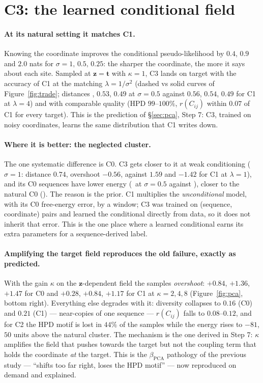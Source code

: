 \section{C3: the learned conditional field}\label{sec:c3}
\paragraph{At its natural setting it matches C1.} Knowing the coordinate improves the conditional
pseudo-likelihood by $0.4$, $0.9$ and $2.0$ nats for $\sigma=1,\,0.5,\,0.25$: the sharper the
coordinate, the more it says about each site. Sampled at $\bm z=\bm t$ with $\kappa=1$, C3 lands on
target with the accuracy of C1 at the matching $\lambda=1/\sigma^2$ (dashed vs solid curves of
Figure~\ref{fig:trade}; distances \CthreeAsHKonedist, $0.53$, $0.49$ at $\sigma=0.5$ against $0.56$,
$0.54$, $0.49$ for C1 at $\lambda=4$) and with comparable quality (HPD $99$--$100\%$,
$r(C_{ij})$ within $0.07$ of C1 for every target). This is the prediction of \S\ref{sec:pca}, Step 7: C3,
trained on noisy coordinates, learns the same distribution that C1 writes down.

\paragraph{Where it is better: the neglected cluster.} The one systematic difference is C0. C3 gets
closer to it at weak conditioning ($\sigma=1$: distance $0.74$, overshoot $-0.56$, against $1.59$
and $-1.42$ for C1 at $\lambda=1$), and its C0 sequences have lower energy (\CthreeAsHKoneE\ at
$\sigma=0.5$ against \ConeALfourE), closer to the natural C0 (\NatEA). The reason is the prior. C1
multiplies the \emph{unconditional} model, with its C0 free-energy error, by a window; C3 was trained
on (sequence, coordinate) pairs and learned the conditional directly from data, so it does not
inherit that error. This is the one place where a learned conditional earns its extra parameters
for a sequence-derived label.

\paragraph{Amplifying the target field reproduces the old failure, exactly as predicted.} With the
gain $\kappa$ on the $\bm z$-dependent field the samples \emph{overshoot}: $+0.84$, $+1.36$,
$+1.47$ for C0 and $+0.28$, $+0.84$, $+1.17$ for C1 at $\kappa=2,4,8$ (Figure~\ref{fig:pca}, bottom
right). Everything else degrades with it: diversity collapses to $0.16$ (C0) and $0.21$ (C1) ---
near-copies of one sequence --- $r(C_{ij})$ falls to $0.08$--$0.12$, and for C2 the HPD motif is lost
in $44\%$ of the samples while the energy rises to $-81$, $50$ units above the natural cluster. The
mechanism is the one derived in Step 7: $\kappa$ amplifies the field that pushes towards the target
but not the coupling term that holds the coordinate \emph{at} the target. This is the
$\beta_\mathrm{PCA}$ pathology of the previous study --- ``shifts too far right, loses the HPD
motif'' --- now reproduced on demand and explained.

